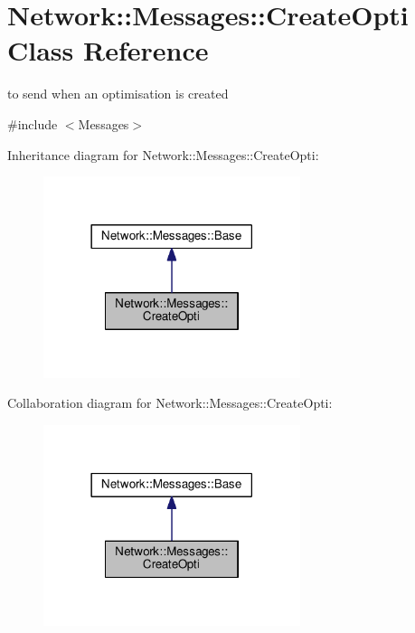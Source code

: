 \hypertarget{class_network_1_1_messages_1_1_create_opti}{}\section{Network\+:\+:Messages\+:\+:Create\+Opti Class Reference}
\label{class_network_1_1_messages_1_1_create_opti}


to send when an optimisation is created  




{\ttfamily \#include $<$Messages$>$}



Inheritance diagram for Network\+:\+:Messages\+:\+:Create\+Opti\+:
\nopagebreak
\begin{figure}[H]
\begin{center}
\leavevmode
\includegraphics[width=213pt]{class_network_1_1_messages_1_1_create_opti__inherit__graph}
\end{center}
\end{figure}


Collaboration diagram for Network\+:\+:Messages\+:\+:Create\+Opti\+:
\nopagebreak
\begin{figure}[H]
\begin{center}
\leavevmode
\includegraphics[width=213pt]{class_network_1_1_messages_1_1_create_opti__coll__graph}
\end{center}
\end{figure}
